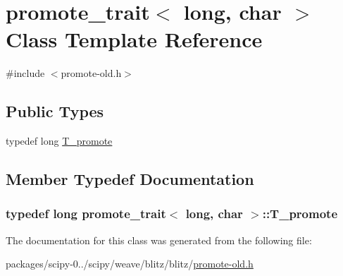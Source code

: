 \hypertarget{classpromote__trait_3_01long_00_01char_01_4}{}\section{promote\+\_\+trait$<$ long, char $>$ Class Template Reference}
\label{classpromote__trait_3_01long_00_01char_01_4}


{\ttfamily \#include $<$promote-\/old.\+h$>$}

\subsection*{Public Types}
\begin{DoxyCompactItemize}
\item 
typedef long \hyperlink{classpromote__trait_3_01long_00_01char_01_4_a27eb39d8189d19782e43b1e2ba17403a}{T\+\_\+promote}
\end{DoxyCompactItemize}


\subsection{Member Typedef Documentation}
\hypertarget{classpromote__trait_3_01long_00_01char_01_4_a27eb39d8189d19782e43b1e2ba17403a}{}
\subsubsection[{T\+\_\+promote}]{\setlength{\rightskip}{0pt plus 5cm}typedef long {\bf promote\+\_\+trait}$<$ long, char $>$\+::{\bf T\+\_\+promote}}\label{classpromote__trait_3_01long_00_01char_01_4_a27eb39d8189d19782e43b1e2ba17403a}


The documentation for this class was generated from the following file\+:\begin{DoxyCompactItemize}
\item 
packages/scipy-\/0../scipy/weave/blitz/blitz/\hyperlink{promote-old_8h}{promote-\/old.\+h}\end{DoxyCompactItemize}
